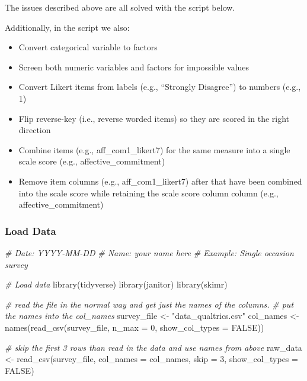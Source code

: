 \documentclass[
]{krantz}
\makeatletter
\newenvironment{Shaded}{\begin{snugshade}}{\end{snugshade}}
\newcommand{\AttributeTok}[1]{\textcolor[rgb]{0.61,0.61,0.61}{#1}}
\newcommand{\CommentTok}[1]{\textcolor[rgb]{0.37,0.37,0.37}{\textit{#1}}}
\newcommand{\ConstantTok}[1]{\textcolor[rgb]{0,0,0}{#1}}
\newcommand{\DecValTok}[1]{\textcolor[rgb]{0.06,0.06,0.06}{#1}}
\newcommand{\FunctionTok}[1]{\textcolor[rgb]{0,0,0}{#1}}
\newcommand{\NormalTok}[1]{#1}
\newcommand{\OtherTok}[1]{\textcolor[rgb]{0.37,0.37,0.37}{#1}}
\newcommand{\StringTok}[1]{\textcolor[rgb]{0.5,0.5,0.5}{#1}}
\newenvironment{kframe}{%
\medskip{}
\setlength{\fboxsep}{.8em}
 \def\at@end@of@kframe{}%
 \ifinner\ifhmode%
  \def\at@end@of@kframe{\end{minipage}}%
  \begin{minipage}{\columnwidth}%
 \fi\fi%
 \def\FrameCommand##1{\hskip\@totalleftmargin \hskip-\fboxsep
 \colorbox{shadecolor}{##1}\hskip-\fboxsep
     \hskip-\linewidth \hskip-\@totalleftmargin \hskip\columnwidth}%
 \MakeFramed {\advance\hsize-\width
   \@totalleftmargin\z@ \linewidth\hsize
   \@setminipage}}%
 {\par\unskip\endMakeFramed%
 \at@end@of@kframe}
\renewenvironment{Shaded}{\begin{kframe}}{\end{kframe}}
\makeatother
\begin{document}
The issues described above are all solved with the script below.

Additionally, in the script we also:

\begin{itemize}
\item
  Convert categorical variable to factors
\item
  Screen both numeric variables and factors for impossible values
\item
  Convert Likert items from labels (e.g., ``Strongly Disagree'') to numbers (e.g., 1)
\item
  Flip reverse-key (i.e., reverse worded items) so they are scored in the right direction
\item
  Combine items (e.g., aff\_com1\_likert7) for the same measure into a single scale score (e.g., affective\_commitment)
\item
  Remove item columns (e.g., aff\_com1\_likert7) after that have been combined into the scale score while retaining the scale score column column (e.g., affective\_commitment)
\end{itemize}

\hypertarget{load-data}{%
\subsubsection{Load Data}\label{load-data}}

\begin{Shaded}
\begin{Highlighting}[]
\CommentTok{\# Date: YYYY{-}MM{-}DD}
\CommentTok{\# Name: your name here}
\CommentTok{\# Example: Single occasion survey}

\CommentTok{\# Load data}
\FunctionTok{library}\NormalTok{(tidyverse)}
\FunctionTok{library}\NormalTok{(janitor)}
\FunctionTok{library}\NormalTok{(skimr)}

\CommentTok{\# read the file in the normal way and get just the names of the columns.}
\CommentTok{\# put the names into the col\_names}
\NormalTok{survey\_file }\OtherTok{\textless{}{-}} \StringTok{"data\_qualtrics.csv"}
\NormalTok{col\_names }\OtherTok{\textless{}{-}} \FunctionTok{names}\NormalTok{(}\FunctionTok{read\_csv}\NormalTok{(survey\_file,}
                            \AttributeTok{n\_max =} \DecValTok{0}\NormalTok{,}
                            \AttributeTok{show\_col\_types =} \ConstantTok{FALSE}\NormalTok{))}

\CommentTok{\# skip the first 3 rows than read in the data and use names from above}
\NormalTok{raw\_data }\OtherTok{\textless{}{-}} \FunctionTok{read\_csv}\NormalTok{(survey\_file,}
                  \AttributeTok{col\_names =}\NormalTok{ col\_names, }
                  \AttributeTok{skip =} \DecValTok{3}\NormalTok{,}
                  \AttributeTok{show\_col\_types =} \ConstantTok{FALSE}\NormalTok{)}
\end{Highlighting}
\end{Shaded}
\end{document}
